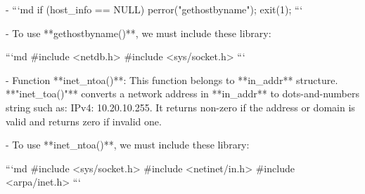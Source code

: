   - ```md
    if (host_info == NULL) {
            perror("gethostbyname");
            exit(1);
        }
    ```

  - To use **gethostbyname()**, we must include these library:

    ```md
    #include  <netdb.h>
    #include <sys/socket.h>
    ```

- Function **inet_ntoa()**: This function belongs to **in_addr** structure. **"inet_toa()"** converts a network address in **in_addr** to dots-and-numbers string such as: IPv4: 10.20.10.255. It returns non-zero if the address or domain is valid and returns zero if invalid one.

  - To use **inet_ntoa()**, we must include these library:

    ```md
    #include <sys/socket.h>
    #include <netinet/in.h>
    #include <arpa/inet.h>
    ```

